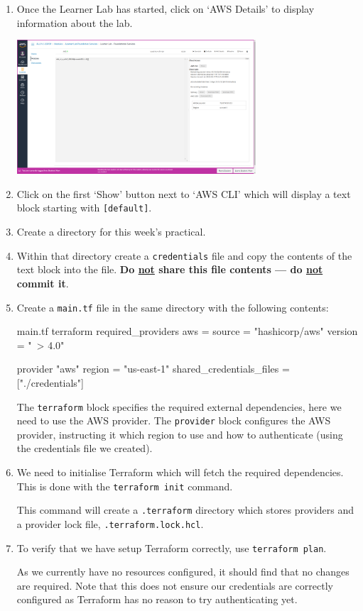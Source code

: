 \documentclass{csse4400}
\begin{document}
\begin{enumerate}
\item Once the Learner Lab has started, click on `AWS Details' to display information about the lab.

\includegraphics[width=0.7\textwidth]{images/aws-details}

\item Click on the first `Show' button next to `AWS CLI' which will display a text block starting with \texttt{[default]}.
\item Create a directory for this week's practical.
\item Within that directory create a \texttt{credentials} file and copy the contents of the text block into the file.
\textbf{Do \underline{not} share this file contents --- do \underline{not} commit it}.
\item Create a \texttt{main.tf} file in the same directory with the following contents:
\begin{code}[language=terraform]{main.tf}
terraform {
    required_providers {
        aws = {
            source  = "hashicorp/aws"
            version = "~> 4.0"
        }
    }
}

provider "aws" {
    region = "us-east-1"
    shared_credentials_files = ["./credentials"]
}
\end{code}

The \texttt{terraform} block specifies the required external dependencies, here we need to use the AWS provider.
The \texttt{provider} block configures the AWS provider, instructing it which region to use and how to authenticate (using the credentials file we created).

\item We need to initialise Terraform which will fetch the required dependencies. This is done with the \texttt{terraform init} command.

This command will create a \texttt{.terraform} directory which stores providers and a provider lock file, \texttt{.terraform.lock.hcl}.

\item To verify that we have setup Terraform correctly, use \texttt{terraform plan}.

As we currently have no resources configured, it should find that no changes are required.
Note that this does not ensure our credentials are correctly configured as Terraform has no reason to try authenticating yet.

\end{enumerate}
\end{document}
